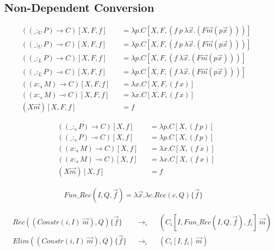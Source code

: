 \documentclass{article}
\begin{document}
\subsection{Non-Dependent Conversion}

\begin{align*}
  & ((\_ :_U P) \rightarrow C)[X,F,f] && = \lambda p.C[X,F,(f\ p\ \lambda \overrightarrow{x}.(F \overrightarrow{m} (p \overrightarrow{x})))] \\
  & ((\_ :_U P) \multimap C)[X,F,f] && = \lambda p.C[X,F,(f\ p\ \lambda \overrightarrow{x}.(F \overrightarrow{m} (p \overrightarrow{x})))] \\
  & ((\_ :_L P) \rightarrow C)[X,F,f] && = \lambda p.C[X,F,(f\ \lambda \overrightarrow{x}.(F \overrightarrow{m} (p \overrightarrow{x})))] \\
  & ((\_ :_L P) \multimap C)[X,F,f] && = \lambda p.C[X,F,(f\ \lambda \overrightarrow{x}.(F \overrightarrow{m} (p \overrightarrow{x})))] \\
  & ((x :_s M) \rightarrow C)[X,F,f] && = \lambda x.C[X,F,(f\ x)] \\
  & ((x :_s M) \multimap C)[X,F,f] && = \lambda x.C[X,F,(f\ x)] \\
  & (X \overrightarrow{m})[X,F,f] && = f
\end{align*}

\begin{align*}
  & ((\_ :_s P) \rightarrow C)[X,f] && = \lambda p.C[X,(f\ p)] \\
  & ((\_ :_s P) \multimap C)[X,f] && = \lambda p.C[X,(f\ p)] \\
  & ((x :_s M) \rightarrow C)[X,f] && = \lambda x.C[X,(f\ x)] \\
  & ((x :_s M) \multimap C)[X,f] && = \lambda x.C[X,(f\ x)] \\
  & (X \overrightarrow{m})[X,f] && = f
\end{align*}

\begin{align*}
  Fun\_Rec(I,Q,\overrightarrow{f}) = \lambda \overrightarrow{x}. \lambda c.Rec(c,Q)\{\overrightarrow{f}\}
\end{align*}

\begin{align*}
  & Rec((Constr(i, I)\ \overrightarrow{m}), Q)\{\overrightarrow{f}\} && \rightarrow_\iota && (C_i[I,Fun\_Rec(I,Q,\overrightarrow{f}),f_i]\ \overrightarrow{m}) \\
  & Elim((Constr(i, I)\ \overrightarrow{m}), Q)\{\overrightarrow{f}\} && \rightarrow_\iota && (C_i[I,f_i]\ \overrightarrow{m})
\end{align*}
\end{document}
